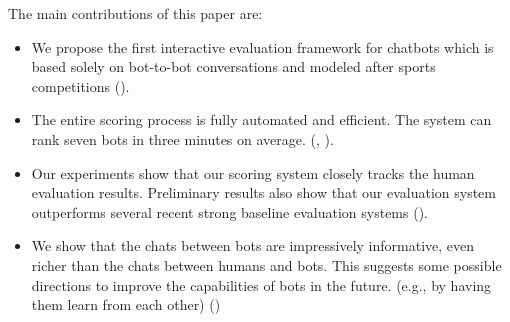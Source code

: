 
The main contributions of this paper are:
\begin{itemize}
\item We propose the first interactive evaluation framework for chatbots which
is based solely on bot-to-bot conversations and modeled after sports competitions ().
\item  The entire scoring process is fully automated and efficient. 
The system can rank seven bots in three minutes on average.
(, ).
\item  Our experiments show that our scoring system closely tracks the 
human evaluation results. Preliminary results also show
that our evaluation system outperforms 
several recent strong baseline evaluation systems ().
\item %
We show that the chats between bots are impressively informative, 
even richer than the chats between humans and bots.
This suggests some possible directions to improve 
the capabilities of bots in the future.
(e.g., by having them learn from each other)  ()
\end{itemize}

